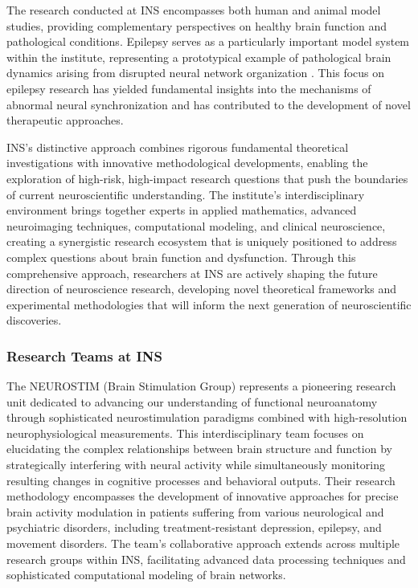 \documentclass[a4paper,12pt,twoside]{article}
\begin{document}
The research conducted at INS encompasses both human and animal model studies, providing complementary perspectives on healthy brain function and pathological conditions. Epilepsy serves as a particularly important model system within the institute, representing a prototypical example of pathological brain dynamics arising from disrupted neural network organization \cite{murphy2009sleep}. This focus on epilepsy research has yielded fundamental insights into the mechanisms of abnormal neural synchronization and has contributed to the development of novel therapeutic approaches.

INS's distinctive approach combines rigorous fundamental theoretical investigations with innovative methodological developments, enabling the exploration of high-risk, high-impact research questions that push the boundaries of current neuroscientific understanding. The institute's interdisciplinary environment brings together experts in applied mathematics, advanced neuroimaging techniques, computational modeling, and clinical neuroscience, creating a synergistic research ecosystem that is uniquely positioned to address complex questions about brain function and dysfunction. Through this comprehensive approach, researchers at INS are actively shaping the future direction of neuroscience research, developing novel theoretical frameworks and experimental methodologies that will inform the next generation of neuroscientific discoveries.

\subsubsection{Research Teams at INS}

The NEUROSTIM (Brain Stimulation Group) represents a pioneering research unit dedicated to advancing our understanding of functional neuroanatomy through sophisticated neurostimulation paradigms combined with high-resolution neurophysiological measurements. This interdisciplinary team focuses on elucidating the complex relationships between brain structure and function by strategically interfering with neural activity while simultaneously monitoring resulting changes in cognitive processes and behavioral outputs. Their research methodology encompasses the development of innovative approaches for precise brain activity modulation in patients suffering from various neurological and psychiatric disorders, including treatment-resistant depression, epilepsy, and movement disorders. The team's collaborative approach extends across multiple research groups within INS, facilitating advanced data processing techniques and sophisticated computational modeling of brain networks.
\end{document}
